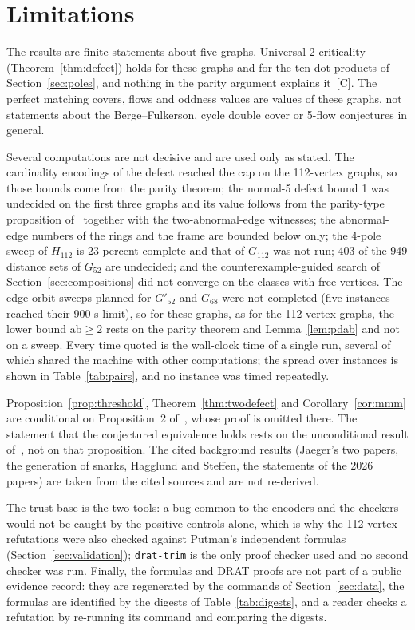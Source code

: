 \documentclass[11pt]{article}
\theoremstyle{definition}
\theoremstyle{remark}
\newcommand{\Gmain}{G_{112}}
\newcommand{\Gsym}{H_{112}}
\newcommand{\Gfty}{G_{52}}
\newcommand{\Gftyb}{G'_{52}}
\newcommand{\Gsix}{G_{68}}
\newcommand{\ab}{\mathrm{ab}}
\newcommand{\cj}{\textup{[C]}}
\begin{document}
\section{Limitations}\label{sec:limits}

The results are finite statements about five graphs. Universal 2-criticality (Theorem~\ref{thm:defect})
holds for these graphs and for the ten dot products of Section~\ref{sec:poles}, and nothing in the
parity argument explains it~\cj{}. The perfect matching covers, flows and oddness values are values of
these graphs, not statements about the Berge--Fulkerson, cycle double cover or 5-flow conjectures in
general.

Several computations are not decisive and are used only as stated. The cardinality encodings of the
defect reached the cap on the 112-vertex graphs, so those bounds come from the parity theorem; the
normal-5 defect bound 1 was undecided on the first three graphs and its value follows from the
parity-type proposition of~\cite{MMM2021} together with the two-abnormal-edge witnesses; the
abnormal-edge numbers of the rings and the frame are bounded below only; the 4-pole sweep of $\Gsym$
is 23 percent complete and that of $\Gmain$ was not run; 403 of the 949 distance sets of $\Gfty$ are
undecided; and the counterexample-guided search of Section~\ref{sec:compositions} did not converge on
the classes with free vertices. The edge-orbit sweeps planned for $\Gftyb$ and $\Gsix$ were not
completed (five instances reached their 900 s limit), so for these graphs, as for the 112-vertex
graphs, the lower bound $\ab \ge 2$ rests on the parity theorem and Lemma~\ref{lem:pdab} and not on a
sweep. Every time quoted is the wall-clock time of a single run, several of which shared the machine with
other computations; the spread over instances is shown in Table~\ref{tab:pairs}, and no instance was
timed repeatedly.

Proposition~\ref{prop:threshold}, Theorem~\ref{thm:twodefect} and Corollary~\ref{cor:mmm} are conditional on Proposition~2
of~\cite{MMM2021}, whose proof is omitted there. The statement that the conjectured equivalence
holds rests on the unconditional result of~\cite{UD2026}, not on that proposition. The cited
background results (Jaeger's two papers, the generation of snarks, Hagglund and Steffen, the
statements of the 2026 papers) are taken from the cited sources and are not
re-derived.

The trust base is the two tools: a bug common to the encoders and the checkers would not be caught by
the positive controls alone, which is why the 112-vertex refutations were also checked against
Putman's independent formulas (Section~\ref{sec:validation}); \texttt{drat-trim} is the only proof
checker used and no second checker was run. Finally, the formulas and DRAT proofs are not part of a
public evidence record: they are regenerated by the commands of Section~\ref{sec:data}, the
formulas are identified by the digests of Table~\ref{tab:digests}, and a reader checks a
refutation by re-running its command and comparing the digests.
\end{document}
